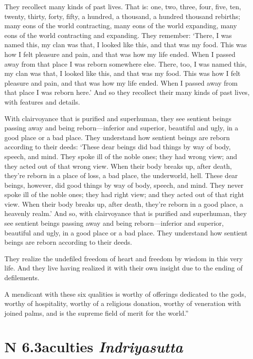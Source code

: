 \documentclass[12pt,openany]{book}%
\newcommand*{\suttatitleacronym}[1]{\smaller[2]{#1}\vspace*{.3em}}
\newcommand*{\suttatitletranslation}[1]{\linebreak{#1}}
\newcommand*{\suttatitleroot}[1]{\linebreak\smaller[2]\itshape{#1}}
\newcommand*{\tocacronym}[1]{\hspace*{-3.3em}{#1}\quad}
\newcommand*{\toctranslation}[1]{#1}
\newcommand*{\tocroot}[1]{(\textit{#1})}
\begin{document}
They recollect many kinds of past lives. That is: one, two, three, four, five, ten, twenty, thirty, forty, fifty, a hundred, a thousand, a hundred thousand rebirths; many eons of the world contracting, many eons of the world expanding, many eons of the world contracting and expanding. They remember: ‘There, I was named this, my clan was that, I looked like this, and that was my food. This was how I felt pleasure and pain, and that was how my life ended. When I passed away from that place I was reborn somewhere else. There, too, I was named this, my clan was that, I looked like this, and that was my food. This was how I felt pleasure and pain, and that was how my life ended. When I passed away from that place I was reborn here.’ And so they recollect their many kinds of past lives, with features and details. 

With clairvoyance that is purified and superhuman, they see sentient beings passing away and being reborn—inferior and superior, beautiful and ugly, in a good place or a bad place. They understand how sentient beings are reborn according to their deeds: ‘These dear beings did bad things by way of body, speech, and mind. They spoke ill of the noble ones; they had wrong view; and they acted out of that wrong view. When their body breaks up, after death, they’re reborn in a place of loss, a bad place, the underworld, hell. These dear beings, however, did good things by way of body, speech, and mind. They never spoke ill of the noble ones; they had right view; and they acted out of that right view. When their body breaks up, after death, they’re reborn in a good place, a heavenly realm.’ And so, with clairvoyance that is purified and superhuman, they see sentient beings passing away and being reborn—inferior and superior, beautiful and ugly, in a good place or a bad place. They understand how sentient beings are reborn according to their deeds. 

They realize the undefiled freedom of heart and freedom by wisdom in this very life. And they live having realized it with their own insight due to the ending of defilements. 

A mendicant with these six qualities is worthy of offerings dedicated to the gods, worthy of hospitality, worthy of a religious donation, worthy of veneration with joined palms, and is the supreme field of merit for the world.” 

%
\section*{{\suttatitleacronym AN 6.3}{\suttatitletranslation Faculties }{\suttatitleroot Indriyasutta}}
\addcontentsline{toc}{section}{\tocacronym{AN 6.3} \toctranslation{Faculties } \tocroot{Indriyasutta}}
\end{document}
